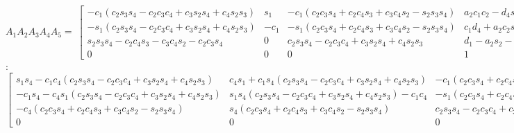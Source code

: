 \documentclass{article}
\begin{document}
\bigskip 

$A_{1}A_{2}A_{3}A_{4}A_{5}=\ \left[ 
\begin{array}{cccc}
-c_{1}\left(
c_{2}s_{3}s_{4}-c_{2}c_{3}c_{4}+c_{3}s_{2}s_{4}+c_{4}s_{2}s_{3}\right)  & 
s_{1} & -c_{1}\left(
c_{2}c_{3}s_{4}+c_{2}c_{4}s_{3}+c_{3}c_{4}s_{2}-s_{2}s_{3}s_{4}\right)  & 
a_{2}c_{1}c_{2}-d_{4}s_{1}+a_{3}c_{1}c_{2}c_{3}-a_{3}c_{1}s_{2}s_{3} \\ 
-s_{1}\left(
c_{2}s_{3}s_{4}-c_{2}c_{3}c_{4}+c_{3}s_{2}s_{4}+c_{4}s_{2}s_{3}\right)  & 
-c_{1} & -s_{1}\left(
c_{2}c_{3}s_{4}+c_{2}c_{4}s_{3}+c_{3}c_{4}s_{2}-s_{2}s_{3}s_{4}\right)  & 
c_{1}d_{4}+a_{2}c_{2}s_{1}+a_{3}c_{2}c_{3}s_{1}-a_{3}s_{1}s_{2}s_{3} \\ 
s_{2}s_{3}s_{4}-c_{2}c_{4}s_{3}-c_{3}c_{4}s_{2}-c_{2}c_{3}s_{4} & 0 & 
c_{2}s_{3}s_{4}-c_{2}c_{3}c_{4}+c_{3}s_{2}s_{4}+c_{4}s_{2}s_{3} & 
d_{1}-a_{2}s_{2}-a_{3}c_{2}s_{3}-a_{3}c_{3}s_{2} \\ 
0 & 0 & 0 & 1%
\end{array}%
\right] \allowbreak \left[ 
\begin{array}{cccc}
c_{4} & -s_{4} & 0 & 0 \\ 
s_{4} & c_{4} & 0 & 0 \\ 
0 & 0 & 1 & d_{4} \\ 
0 & 0 & 0 & 1%
\end{array}%
\right] $ : $\left[ 
\begin{array}{cccc}
s_{1}s_{4}-c_{1}c_{4}\left(
c_{2}s_{3}s_{4}-c_{2}c_{3}c_{4}+c_{3}s_{2}s_{4}+c_{4}s_{2}s_{3}\right)  & 
c_{4}s_{1}+c_{1}s_{4}\left(
c_{2}s_{3}s_{4}-c_{2}c_{3}c_{4}+c_{3}s_{2}s_{4}+c_{4}s_{2}s_{3}\right)  & 
-c_{1}\left(
c_{2}c_{3}s_{4}+c_{2}c_{4}s_{3}+c_{3}c_{4}s_{2}-s_{2}s_{3}s_{4}\right)  & 
a_{2}c_{1}c_{2}-c_{1}d_{4}\left(
c_{2}c_{3}s_{4}+c_{2}c_{4}s_{3}+c_{3}c_{4}s_{2}-s_{2}s_{3}s_{4}\right)
-d_{4}s_{1}+a_{3}c_{1}c_{2}c_{3}-a_{3}c_{1}s_{2}s_{3} \\ 
-c_{1}s_{4}-c_{4}s_{1}\left(
c_{2}s_{3}s_{4}-c_{2}c_{3}c_{4}+c_{3}s_{2}s_{4}+c_{4}s_{2}s_{3}\right)  & 
s_{1}s_{4}\left(
c_{2}s_{3}s_{4}-c_{2}c_{3}c_{4}+c_{3}s_{2}s_{4}+c_{4}s_{2}s_{3}\right)
-c_{1}c_{4} & -s_{1}\left(
c_{2}c_{3}s_{4}+c_{2}c_{4}s_{3}+c_{3}c_{4}s_{2}-s_{2}s_{3}s_{4}\right)  & 
c_{1}d_{4}-d_{4}s_{1}\left(
c_{2}c_{3}s_{4}+c_{2}c_{4}s_{3}+c_{3}c_{4}s_{2}-s_{2}s_{3}s_{4}\right)
+a_{2}c_{2}s_{1}+a_{3}c_{2}c_{3}s_{1}-a_{3}s_{1}s_{2}s_{3} \\ 
-c_{4}\left(
c_{2}c_{3}s_{4}+c_{2}c_{4}s_{3}+c_{3}c_{4}s_{2}-s_{2}s_{3}s_{4}\right)  & 
s_{4}\left(
c_{2}c_{3}s_{4}+c_{2}c_{4}s_{3}+c_{3}c_{4}s_{2}-s_{2}s_{3}s_{4}\right)  & 
c_{2}s_{3}s_{4}-c_{2}c_{3}c_{4}+c_{3}s_{2}s_{4}+c_{4}s_{2}s_{3} & 
d_{1}+d_{4}\left(
c_{2}s_{3}s_{4}-c_{2}c_{3}c_{4}+c_{3}s_{2}s_{4}+c_{4}s_{2}s_{3}\right)
-a_{2}s_{2}-a_{3}c_{2}s_{3}-a_{3}c_{3}s_{2} \\ 
0 & 0 & 0 & 1%
\end{array}%
\right] \allowbreak $
\end{document}
